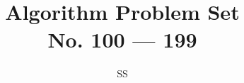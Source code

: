 \documentclass[a4paper,12pt]{article}
\title{Algorithm Problem Set \\ \large No. 100 --- 199}
\author{SS}
\begin{document}
\renewcommand{\thelstlisting}{\thesection.\arabic{lstlisting}}
\newcommand{\fcc}[1]{\lstinline[language=C++, basicstyle=\small\ttfamily, keywordstyle=\bfseries\color{green!40!black}]|#1|}
\newcommand{\fcj}[1]{\lstinline[language=Java, basicstyle=\small\ttfamily, keywordstyle=\bfseries\color{green!40!black}]|#1|}
\maketitle




















































































\end{document}
